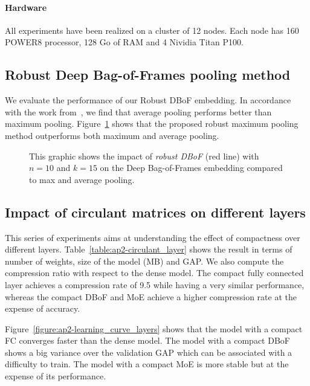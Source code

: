 \paragraph{Hardware}
All experiments have been realized on a cluster of 12 nodes. Each node has 160 POWER8 processor, 128 Go of RAM and 4 Nividia Titan P100.


\subsection{Robust Deep Bag-of-Frames pooling method}
\label{subsection:ap2-exp_bagging}

We evaluate the performance of our Robust DBoF embedding.
In accordance with the work from~\cite{abu2016youtube}, we find that average pooling performs better than maximum pooling. 
Figure~\ref{figure:ap2-learning_curve_bagging} shows that the proposed robust maximum pooling method outperforms both maximum and average pooling.

\begin{figure}[htb]
  \centering
  
  \caption{This graphic shows the impact of \emph{robust DBoF} (\ie red line) with $n=10$ and $k=15$ on the Deep Bag-of-Frames embedding compared to max and average pooling.}
  \label{figure:ap2-learning_curve_bagging}
\end{figure}

\subsection{Impact of circulant matrices on different layers}

This series of experiments aims at understanding the effect of compactness over different layers.
Table~\ref{table:ap2-circulant_layer} shows the result in terms of number of weights, size of the model (MB) and GAP.
We also compute the compression ratio with respect to the dense model.
The compact fully connected layer achieves a compression rate of 9.5 while having a very similar performance, whereas the compact DBoF and MoE achieve a higher compression rate at the expense of accuracy. 

Figure~\ref{figure:ap2-learning_curve_layers} shows that the model with a compact FC converges faster than the dense model.
The model with a compact DBoF shows a big variance over the validation GAP which can be associated with a difficulty to train.
The model with a compact MoE is more stable but at the expense of its performance.

